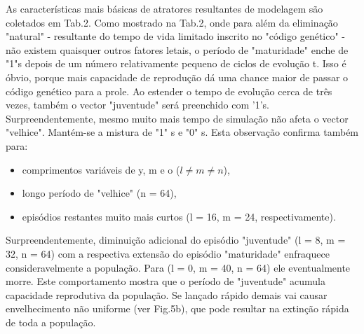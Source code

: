 \documentclass{article}
\begin{document}
As características mais básicas de atratores resultantes de modelagem são coletados em Tab.2. Como mostrado na Tab.2, onde para além da eliminação "natural" - resultante do tempo de vida limitado inscrito no "código genético" - não existem quaisquer outros fatores letais, o período de "maturidade" enche de "1"s depois de um número relativamente pequeno de ciclos de evolução t. Isso é óbvio, porque mais capacidade de reprodução dá uma chance maior de passar o código genético para a prole. Ao estender o tempo de evolução cerca de três vezes, também o vector "juventude" será preenchido com '1's. Surpreendentemente, mesmo muito mais tempo de simulação não afeta o vector "velhice". Mantém-se a mistura de "1" s e "0" s. Esta observação confirma também para:

\begin{itemize}
\item comprimentos variáveis de y, m e o ($l \neq m \neq n$),
\item longo período de "velhice" (n = 64),
\item episódios restantes muito mais curtos (l = 16, m = 24, respectivamente).
\end{itemize}


Surpreendentemente, diminuição adicional do episódio "juventude" (l = 8, m = 32, n = 64) com a respectiva extensão do episódio "maturidade" enfraquece consideravelmente a população. Para (l = 0, m = 40, n = 64) ele eventualmente morre. Este comportamento mostra que o período de "juventude" acumula capacidade reprodutiva da população. Se lançado rápido demais vai causar envelhecimento não uniforme (ver Fig.5b), que pode resultar na extinção rápida de toda a população.

\end{document}
